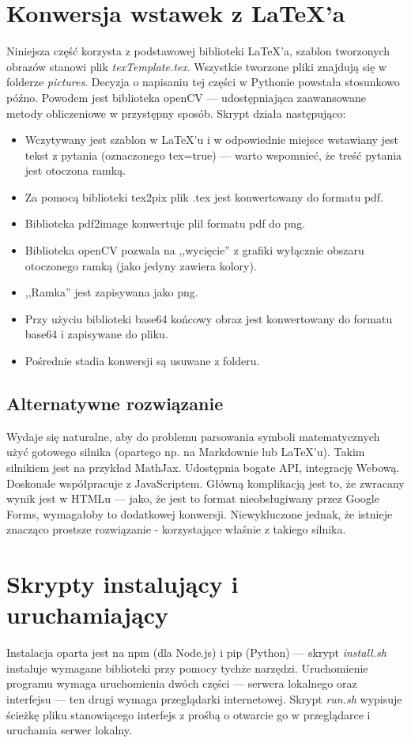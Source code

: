 \section{Konwersja wstawek z \LaTeX{}'a}
Niniejsza część korzysta z podstawowej biblioteki \LaTeX{}'a, szablon tworzonych obrazów stanowi plik \textit{texTemplate.tex}. Wszystkie tworzone pliki znajdują się w folderze \textit{pictures}.
\ind Decyzja o napisaniu tej części w Pythonie powstała stosunkowo późno. Powodem jest biblioteka openCV --- udostępniająca zaawansowane metody obliczeniowe w przystępny sposób. Skrypt działa następująco:
\begin{itemize}
\item Wczytywany jest szablon w \LaTeX{}'u i w odpowiednie miejsce wstawiany jest tekst z pytania (oznaczonego tex=true) --- warto wspomnieć, że treść pytania jest otoczona ramką.
\item Za pomocą biblioteki tex2pix plik .tex jest konwertowany do formatu pdf.
\item Biblioteka pdf2image konwertuje plil formatu pdf do png.
\item Biblioteka openCV pozwala na ,,wycięcie'' z grafiki wyłącznie obszaru otoczonego ramką (jako jedyny zawiera kolory).
\item ,,Ramka'' jest zapisywana jako png.
\item Przy użyciu biblioteki base64 końcowy obraz jest konwertowany do formatu base64 i zapisywane do pliku.
\item Pośrednie stadia konwersji są usuwane z folderu.
\end{itemize}
\subsection{Alternatywne rozwiązanie}%
Wydaje się naturalne, aby do problemu parsowania symboli matematycznych użyć gotowego silnika (opartego np. na Markdownie lub \LaTeX{}'u). Takim silnikiem jest na przykład MathJax. Udostępnia bogate API, integrację Webową. Doskonale współpracuje z JavaScriptem. Główną komplikacją jest to, że zwracany wynik jest w HTMLu --- jako, że jest to format nieobsługiwany przez Google Forms,  wymagałoby to dodatkowej konwersji. Niewykluczone jednak, że istnieje znacząco prostsze rozwiązanie - korzystające właśnie z takiego silnika.
\section{Skrypty instalujący i uruchamiający}
Instalacja oparta jest na npm (dla Node.js) i pip (Python) --- skrypt \textit{install.sh} instaluje wymagane biblioteki przy pomocy tychże narzędzi.
\ind  Uruchomienie programu wymaga uruchomienia dwóch części --- serwera lokalnego oraz interfejsu --- ten drugi wymaga przeglądarki internetowej. Skrypt \textit{run.sh} wypisuje ścieżkę pliku stanowiącego interfejs z prośbą o otwarcie go w przeglądarce i uruchamia serwer lokalny.










